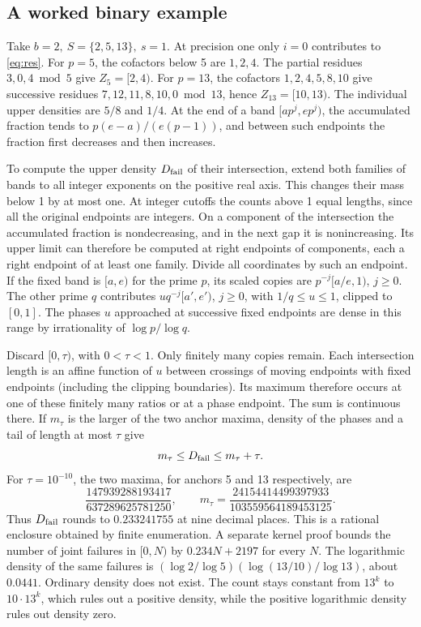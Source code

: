\documentclass[11pt]{article}
\begin{document}
\subsection*{A worked binary example}
Take \(b=2,\ S=\{2,5,13\},\ s=1\). At precision one only \(i=0\) contributes to \eqref{eq:res}. For \(p=5\), the cofactors below 5 are \(1,2,4\). The partial residues \(3,0,4\bmod5\) give \(Z_5=[2,4)\). For \(p=13\), the cofactors \(1,2,4,5,8,10\) give successive residues \(7,12,11,8,10,0\bmod13\), hence \(Z_{13}=[10,13)\). The individual upper densities are \(5/8\) and \(1/4\). At the end of a band \([ap^j,ep^j)\), the accumulated fraction tends to \(p(e-a)/(e(p-1))\), and between such endpoints the fraction first decreases and then increases.

To compute the upper density \(D_{\rm fail}\) of their intersection, extend both families of bands to all integer exponents on the positive real axis. This changes their mass below 1 by at most one. At integer cutoffs the counts above 1 equal lengths, since all the original endpoints are integers. On a component of the intersection the accumulated fraction is nondecreasing, and in the next gap it is nonincreasing. Its upper limit can therefore be computed at right endpoints of components, each a right endpoint of at least one family. Divide all coordinates by such an endpoint. If the fixed band is \([a,e)\) for the prime \(p\), its scaled copies are \(p^{-j}[a/e,1)\), \(j\ge0\). The other prime \(q\) contributes \(u q^{-j}[a',e')\), \(j\ge0\), with \(1/q\le u\le1\), clipped to \([0,1]\). The phases \(u\) approached at successive fixed endpoints are dense in this range by irrationality of \(\log p/\log q\).

Discard \([0,\tau)\), with \(0<\tau<1\). Only finitely many copies remain. Each intersection length is an affine function of \(u\) between crossings of moving endpoints with fixed endpoints (including the clipping boundaries). Its maximum therefore occurs at one of these finitely many ratios or at a phase endpoint. The sum is continuous there. If \(m_\tau\) is the larger of the two anchor maxima, density of the phases and a tail of length at most \(\tau\) give
\[
 m_\tau\le D_{\rm fail}\le m_\tau+\tau .
\]
For \(\tau=10^{-10}\), the two maxima, for anchors 5 and 13 respectively, are
\[
 \frac{147939288193417}{637289625781250},\qquad
 m_\tau=\frac{24154414499397933}{103559564189453125}.
\]
Thus \(D_{\rm fail}\) rounds to \(0.233241755\) at nine decimal places. This is a rational enclosure obtained by finite enumeration. A separate kernel proof bounds the number of joint failures in \([0,N)\) by \(0.234N+2197\) for every \(N\). The logarithmic density of the same failures is \((\log 2/\log 5)(\log(13/10)/\log13)\), about \(0.0441\). Ordinary density does not exist. The count stays constant from \(13^k\) to \(10\cdot13^k\), which rules out a positive density, while the positive logarithmic density rules out density zero.
\end{document}
